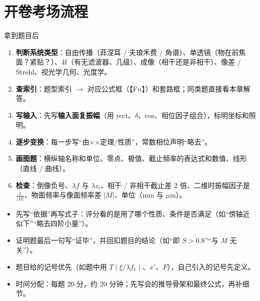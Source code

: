 \section{开卷考场流程}\label{sec:examflow}
\begin{recipe}{拿到题目后}
\begin{enumerate}
\item \textbf{判断系统类型}：自由传播（菲涅耳 / 夫琅禾费 / 角谱）、单透镜（物在前焦面？紧贴？）、4f（有无滤波器、几级）、成像（相干还是非相干）、像差 / Strehl、视光学几何、光度学。
\item \textbf{查索引}：\pageref{tab:typeindex}题型索引 $\to$ 对应公式框（【F$n$】）和套路框；同类题直接看本章解答。
\item \textbf{写输入}：先写\textbf{输入面复振幅}（用 rect、$\delta$、cos、相位因子组合），标明坐标和照明。
\item \textbf{逐步变换}：每一步写“由××定理/性质”，常数相位声明“略去”。
\item \textbf{画图题}：横纵轴名称和单位、零点、极值、截止频率的表达式和数值、线形（直线 / 曲线）。
\item \textbf{检查}：倒像负号、$\lambda f$ 与 $\lambda z_i$、相干 / 非相干截止差 2 倍、二维时振幅因子是 $\frac1{|M|}$、物面频率与像面频率差 $|M|$、单位（mm 与 $\mu$m）。
\end{enumerate}
\end{recipe}

\begin{warn}[答卷书写要点]
\begin{itemize}
\item 先写“依据”再写式子：评分看的是用了哪个性质、条件是否满足（如“傍轴近似下”“略去四阶小量”）。
\item 证明题最后一句写“证毕”，并回扣题目的结论（如“即 $S>0.8$”“与 $M$ 无关”）。
\item 题目给的记号优先（如题中用 $T(\xi/\lambda f_1)$、$x'$、$F$），自己引入的记号先定义。
\item 时间分配：每题 20 分，约 20 分钟；先写会的推导骨架和最终公式，再补细节。
\end{itemize}
\end{warn}
